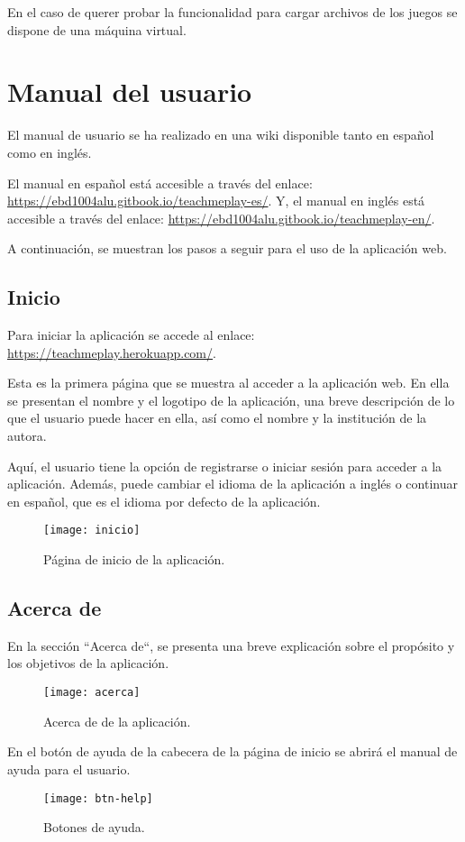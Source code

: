En el caso de querer probar la funcionalidad para cargar archivos de los juegos se dispone de una máquina virtual.

\section{Manual del usuario}
El manual de usuario se ha realizado en una wiki disponible tanto en español como en inglés.

El manual en español está accesible a través del enlace: \url{https://ebd1004alu.gitbook.io/teachmeplay-es/}. Y, el manual en inglés está accesible a través del enlace: \url{https://ebd1004alu.gitbook.io/teachmeplay-en/}.

A continuación, se muestran los pasos a seguir para el uso de la aplicación web.

\subsection{Inicio}
Para iniciar la aplicación se accede al enlace: \url{https://teachmeplay.herokuapp.com/}.

Esta es la primera página que se muestra al acceder a la aplicación web. En ella se presentan el nombre y el logotipo de la aplicación, una breve descripción de lo que el usuario puede hacer en ella, así como el nombre y la institución de la autora.

Aquí, el usuario tiene la opción de registrarse o iniciar sesión para acceder a la aplicación. Además, puede cambiar el idioma de la aplicación a inglés o continuar en español, que es el idioma por defecto de la aplicación.

\begin{figure}[htb]
\centering
\texttt{[image: inicio]}
\caption{Página de inicio de la aplicación.}
\label{fig:inicio}
\end{figure}

\subsection{Acerca de}
En la sección ``Acerca de``, se presenta una breve explicación sobre el propósito y los objetivos de la aplicación.
\begin{figure}[htb]
\centering
\texttt{[image: acerca]}
\caption{Acerca de de la aplicación.}
\label{fig:acerca}
\end{figure}

En el botón de ayuda de la cabecera de la página de inicio se abrirá el manual de ayuda para el usuario. 
\begin{figure}[htb]
\centering
\texttt{[image: btn-help]}
\caption{Botones de ayuda.}
\label{fig:btn-help}
\end{figure}

